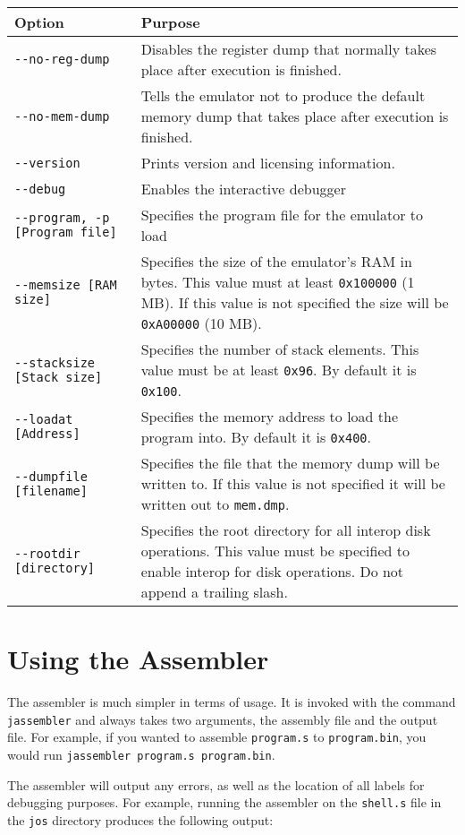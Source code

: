 \documentclass[12pt,letterpaper,titlepage,twoside]{book}
\begin{document}
\begin{longtable}{|p{6cm}|p{6cm}|}
\hline  \textbf{Option} & \textbf{Purpose}   \\ 
\hline  \verb|--no-reg-dump| & Disables the register dump that normally takes place after execution is finished. \\ 
\hline  \verb|--no-mem-dump| & Tells the emulator not to produce the default memory dump that takes place after execution is finished. \\
\hline  \verb|--version| & Prints version and licensing information. \\
\hline  \verb|--debug| & Enables the interactive debugger \\
\hline  \verb|--program, -p [Program file]| & Specifies the program file for the emulator to load \\
\hline  \verb|--memsize [RAM size]| & Specifies the size of the emulator's RAM in bytes. This value must at least \verb|0x100000| (1 MB). If this value is not specified the size will be \verb|0xA00000| (10 MB). \\
\hline  \verb|--stacksize [Stack size]| & Specifies the number of stack elements. This value must be at least \verb|0x96|. By default it is \verb|0x100|. \\
\hline  \verb|--loadat [Address]| & Specifies the memory address to load the program into. By default it is \verb|0x400|. \\
\hline  \verb|--dumpfile [filename]| & Specifies the file that the memory dump will be written to. If this value is not specified it will be written out to \verb|mem.dmp|. \\
\hline  \verb|--rootdir [directory]| & Specifies the root directory for all interop disk operations. This value must be specified to enable interop for disk operations. Do not append a trailing slash. \\
\hline 
\end{longtable} 
\section{Using the Assembler}
The assembler is much simpler in terms of usage. It is invoked with the command \verb|jassembler| and always takes two arguments, the assembly file and the output file. For example, if you wanted to assemble \verb|program.s| to \verb|program.bin|, you would run \verb|jassembler program.s program.bin|.

The assembler will output any errors, as well as the location of all labels for debugging purposes. For example, running the assembler on the \verb|shell.s| file in the \verb|jos| directory produces the following output:
\end{document}

